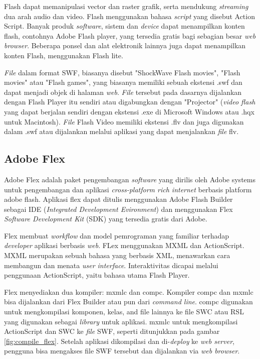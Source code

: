 Flash dapat memanipulasi vector dan raster grafik, serta mendukung \textit{streaming} dua arah audio dan video. Flash menggunakan bahasa \textit{script} yang disebut Action Script. Banyak produk \textit{software}, sistem dan \textit{device} dapat menampilkan konten flash, contohnya Adobe Flash player, yang tersedia gratis bagi sebagian besar \textit{web browser}. Beberapa ponsel dan alat elektronik lainnya juga dapat menampilkan konten Flash, menggunakan Flash lite.

\textit{File} dalam format SWF, biasanya disebut "ShockWave Flash movies", "Flash movies" atau "Flash games", yang biasanya memiliki sebuah ekstensi .swf dan dapat menjadi objek di halaman \textit{web}. \textit{File} tersebut pada dasarnya dijalankan dengan Flash Player itu sendiri atau digabungkan dengan "Projector" (\textit{video flash} yang dapat berjalan sendiri dengan ekstensi .exe di Microsoft Windows atau .hqx untuk Macintosh). \textit{File} Flash Video memiliki ekstensi .flv dan juga digunakan dalam .swf atau dijalankan melalui aplikasi yang dapat menjalankan \textit{file} flv.

\subsection {Adobe Flex}
\label{subsec:adobe_flex}
Adobe Flex adalah paket pengembangan \textit{software} yang dirilis oleh Adobe systems untuk pengembangan dan aplikasi \textit{cross-platform rich internet} berbasis platform adobe flash. Aplikasi flex dapat ditulis menggunakan Adobe Flash Builder sebagai IDE (\textit{Integrated Development Evironment}) dan menggunakan Flex \textit{Software Development Kit} (SDK) yang tersedia gratis dari Adobe. 

Flex membuat \textit{workflow} dan model pemrograman yang familiar terhadap \textit{developer} aplikasi berbasis \textit{web}. FLex menggunakan MXML dan ActionScript. MXML merupakan sebuah bahasa yang berbasis XML, menawarkan cara membangun dan menata \textit{user interface}. Interaktivitas dicapai melalui penggunaan ActionScript, yaitu bahasa utama Flash Player.

Flex menyediakan dua kompiler: mxmlc dan compc. Kompiler compc dan mxmlc bisa dijalankan dari Flex Builder atau pun dari \textit{command line}. compc digunakan untuk mengkompilasi komponen, kelas, and file lainnya ke file SWC atau RSL yang digunakan sebagai \textit{library} untuk aplikasi. mxmlc untuk mengkompilasi ActionScript dan SWC ke \textit{file} SWF, seperti ditunjukkan pada gambar \ref{fig:compile_flex}. Setelah aplikasi dikompilasi dan di-\textit{deploy} ke \textit{web server}, pengguna bisa mengakses file SWF tersebut dan dijalankan via \textit{web browser}.

